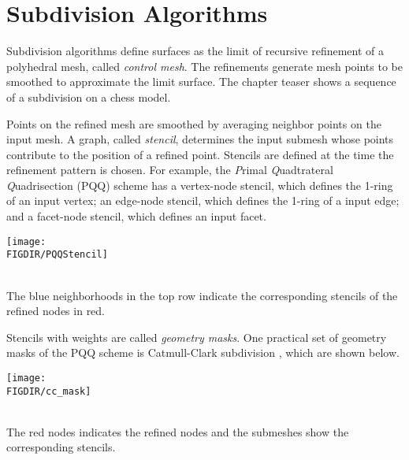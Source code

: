  

\section{Subdivision Algorithms}
Subdivision algorithms define surfaces as the limit
of recursive refinement of a polyhedral mesh, called
\emph{control mesh}. The refinements generate mesh points 
to be smoothed to approximate the limit surface.   
The chapter teaser shows a sequence of a subdivision on 
a chess model. 

Points on the refined mesh are smoothed by averaging
neighbor points on the input mesh. A graph, called \emph{stencil}, 
determines the input submesh whose points contribute to the 
position of a refined point. Stencils are defined at the time 
the refinement pattern is chosen.  
For example, the \emph{P}rimal \emph{Q}uadtrateral \emph{Q}uadrisection 
(PQQ) scheme has a vertex-node stencil, which defines 
the 1-ring of an input vertex; an edge-node stencil, which defines 
the 1-ring of a input edge; and a facet-node stencil, which defines 
an input facet.

\begin{ccTexOnly}
  \begin{center}
    \parbox{0.5\textwidth}{%
      \texttt{[image: \\FIGDIR/PQQStencil]}%
    }\\ \vspace{0.5cm}
    The blue neighborhoods in the top row indicate the corresponding
    stencils of the refined nodes in red. 
  \end{center}
\end{ccTexOnly}

Stencils with weights are called \emph{geometry masks}.
One practical set of geometry masks of the PQQ scheme is
Catmull-Clark subdivision \cite{cgal:cc-rgbss-78}, which are shown below.

\begin{ccTexOnly}
  \begin{center}
    \parbox{0.4\textwidth}{%
      \texttt{[image: \\FIGDIR/cc\_mask]}%
    } \\ \vspace{0.5cm}
    The red nodes indicates the refined nodes and the submeshes 
    show the corresponding stencils.
  \end{center}
\end{ccTexOnly}

